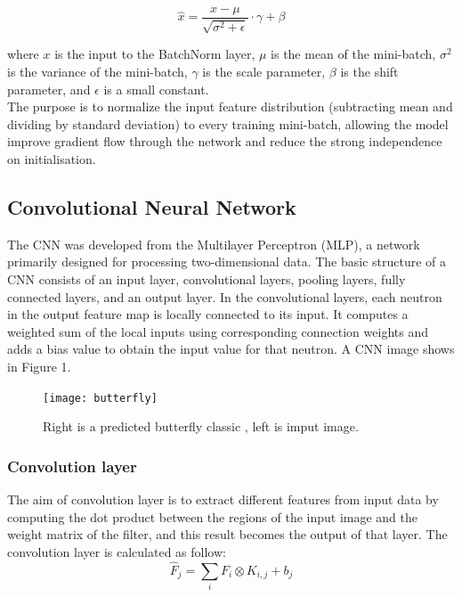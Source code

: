 \documentclass[10pt,twocolumn,letterpaper]{article}
\begin{document}
\begin{equation}
    \hat{x} = \frac{x - \mu}{\sqrt{{\sigma}^2 + \epsilon}} \cdot \gamma + \beta
\end{equation}

where $x$ is the input to the BatchNorm layer, $\mu$ is the mean of the mini-batch, $\sigma^2$ is the variance of the mini-batch, $\gamma$ is the scale parameter, $\beta$ is the shift parameter, and $\epsilon$ is a small constant.\\
\indent The purpose is to normalize the input feature distribution (subtracting mean and dividing by standard deviation) to every training mini-batch, allowing the model improve gradient flow through the network and reduce the strong independence on initialisation\cite{ioffe2015batch}.

\subsection{Convolutional Neural Network} The CNN was developed from the Multilayer Perceptron (MLP), a network primarily designed for processing two-dimensional data. The basic structure of a CNN consists of an input layer, convolutional layers, pooling layers, fully connected layers, and an output layer. In the convolutional layers, each neutron in the output feature map is locally connected to its input. It computes a weighted sum of the local inputs using corresponding connection weights and adds a bias value to obtain the input value for that neutron\cite{lecun2015deep}. A CNN image shows in Figure 1.

\begin{figure}[t]
	\centering
	\texttt{[image: butterfly]}
	\caption{Right is a predicted butterfly classic , left is imput image.}
	\label{fig:svm-lr}
\end{figure}


\subsubsection{ Convolution layer} 
The aim of convolution layer is to extract different features from input data by computing the dot product between the regions of the input image and the weight matrix of the filter, and this result becomes the output of that layer\cite{krizhevsky2012imagenet}. The convolution layer is calculated as follow:
\begin{equation}
    \hat{F}_{j} = \sum_{i} F_{i} \otimes K_{i,j} + b_{j}
\end{equation}
\end{document}
